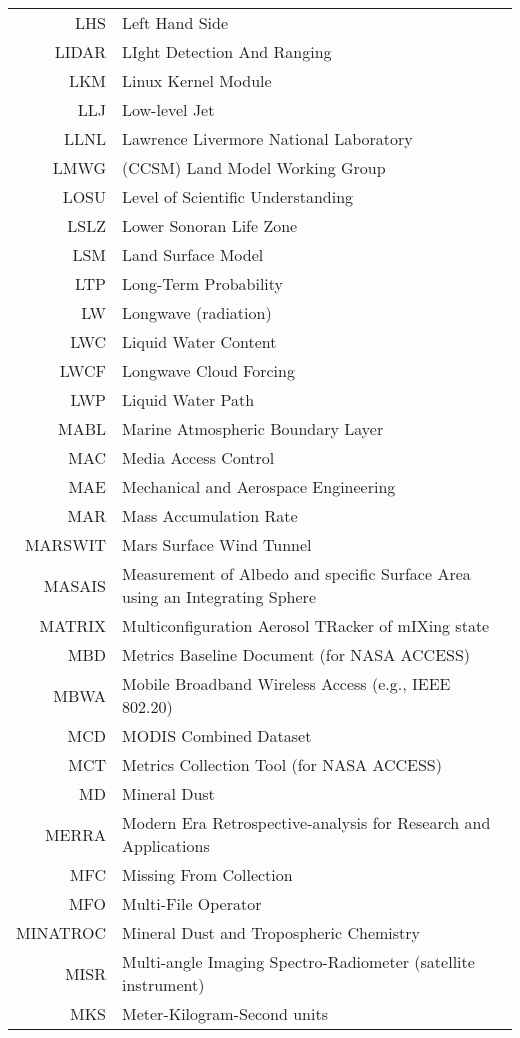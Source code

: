 \documentclass[12pt,twoside]{article}
\begin{document}
\begin{longtable}[>{\bfseries}l]{>{\ttfamily}r l}
LHS & Left Hand Side \\
LIDAR & LIght Detection And Ranging \\
LKM & Linux Kernel Module \\
LLJ & Low-level Jet \\
LLNL & Lawrence Livermore National Laboratory \\
LMWG & (CCSM) Land Model Working Group \\
LOSU & Level of Scientific Understanding \\
LSLZ & Lower Sonoran Life Zone \\
LSM & Land Surface Model \\
LTP & Long-Term Probability \\
LW & Longwave (radiation) \\
LWC & Liquid Water Content \\
LWCF & Longwave Cloud Forcing \\
LWP & Liquid Water Path \\
MABL & Marine Atmospheric Boundary Layer \\
MAC & Media Access Control \\
MAE & Mechanical and Aerospace Engineering \\
MAR & Mass Accumulation Rate \\
MARSWIT & Mars Surface Wind Tunnel \\
MASAIS & Measurement of Albedo and specific Surface Area using an Integrating Sphere \\
MATRIX & Multiconfiguration Aerosol TRacker of mIXing state \\
MBD & Metrics Baseline Document (for NASA ACCESS) \\
MBWA & Mobile Broadband Wireless Access (e.g., IEEE 802.20) \\
MCD & MODIS Combined Dataset \\
MCT & Metrics Collection Tool (for NASA ACCESS) \\
MD & Mineral Dust \\
MERRA & Modern Era Retrospective-analysis for Research and Applications \\
MFC & Missing From Collection \\
MFO & Multi-File Operator \\
MINATROC & Mineral Dust and Tropospheric Chemistry \\
MISR &  Multi-angle Imaging Spectro-Radiometer (satellite instrument) \\
MKS & Meter-Kilogram-Second units \\

\end{longtable}
\end{document}
